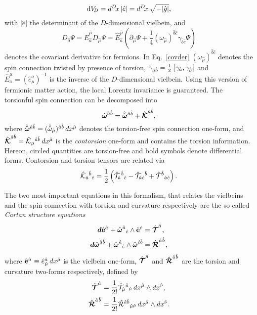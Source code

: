 \begin{align}
  \dv[D]=d^D\! x\,|\hat{e}|= d^D\! x\,\sqrt{-|\hat{g}|},
\end{align}
with $|\hat{e}|$ %
the determinant of the $D$-dimensional vielbein, and
\begin{equation}
  \label{covder}
  D_{\hat{a}}\Psi = \hat{E}_{\hat{a}}^{\hat{\mu}}D_{\hat{\mu}}\Psi = \hat{E}_{\hat{a}}^{\hat{\mu}}\left(\partial_{\hat{\mu}}\Psi + \frac{1}{4}(\omega_{\hat{\mu}})^{\hat{b}\hat{c}}\gamma_{\hat{b}\hat{c}}\Psi\right)
\end{equation}
denotes the covariant derivative for fermions.
In Eq.~\eqref{covder} $(\omega_{\hat{\mu}})^{\hat{b}\hat{c}}$ denotes the spin connection twisted by presence of torsion, $\gamma_{\hat{a}\hat{b}} = \frac{1}{2}\comm{\gamma_{\hat{a}}}{\gamma_{\hat{b}}}$ and $\hat{E}^\mu_a = \left(\hat{e}^a_\mu\right)^{-1}$ is the inverse of the $D$-dimensional vielbein. Using this version of fermionic matter action, the local Lorentz invariance is guaranteed. The torsionful spin connection can be decomposed into
\begin{equation}
  \label{spinconndecomp}
  \wfh^{\hat{a}\hat{b}} = \wfhfree^{\hat{a}\hat{b}} + \hat{\Kf}^{\hat{a}\hat{b}},
\end{equation}
where $\wfhfree^{\hat{a}\hat{b}} = (\hat{\mathring{\omega}}_{\hat{\mu}})^{\hat{a}\hat{b}}\,dx^{\hat{\mu}}$ denotes the torsion-free spin connection one-form, and $\hat{\Kf}^{\hat{a}\hat{b}} = \hat{\K}_{\mu}{}^{\hat{a}\hat{b}}\,dx^{\hat{\mu}}$ is the \textit{contorsion} one-form and contains the torsion information. Hereon, circled quantities are torsion-free and bold symbols denote differential forms.  Contorsion and torsion tensors are related via
\begin{equation}
  \label{generalcontorsion}
  \hat{\K}_{\hat{a}}{}^{\hat{b}}{}_{\hat{c}} = \frac{1}{2}\left(\hat{\T}_{\hat{a}}{}^{\hat{b}}{}_{\hat{c}} - \hat{\T}_{\hat{a}\hat{c}}{}^{\hat{b}} + \hat{\T}^{\hat{b}}{}_{\hat{a}\hat{c}}\right).
\end{equation}

The two most important equations in this formalism, that relates the vielbeins and the spin connection with torsion and curvature respectively are the so called {\it{Cartan structure equations}} 
\begin{align}
  \label{cartantorsion}
  \df\vifhn{a}{} + \wfh^{\hat{a}}{}_{\hat{c}}\wedge\vifhn{c}{} &= \Tfhn{a}{}, \\
  \label{cartancurvature}
  \df\wfh^{\hat{a}\hat{b}} + \wfh^{\hat{a}}{}_{\hat{c}}\wedge\wfh^{\hat{c}\hat{b}} &= \Rfhn{a}{}{b}{},
\end{align}
where $\vifhn{a}{} \equiv \vih^{\hat{a}}_{\hat{\mu}}\,dx^{\hat{\mu}}$ is the vielbein one-form, $\Tfhn{a}{}$ and $\Rfhn{a}{}{b}{}$ are the torsion and curvature two-forms respectively, defined by
\begin{align}
  \Tfhn{a}{} &= \frac{1}{2!}\hat{\T}_{\hat{\mu}}{}^{\hat{a}}{}_{\hat{\nu}}\,dx^{\hat{\mu}}\wedge dx^{\hat{\nu}},\\
  \Rfhn{a}{}{b}{} &= \frac{1}{2!}\Rh^{\hat{a}\hat{b}}{}_{\hat{\mu}\hat{\nu}}\,dx^{\hat{\mu}}\wedge dx^{\hat{\nu}}.
\end{align}



